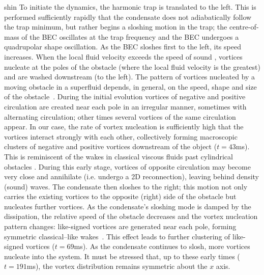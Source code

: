\begin{chapter}{\label{cha:shin}shin}
To initiate the dynamics, the harmonic trap is translated to the left.  This is performed sufficiently rapidly that the condensate does not adiabatically follow the trap minimum, but rather begins a sloshing motion in the trap; the centre-of-mass of the BEC oscillates at the trap frequency and the BEC undergoes a quadrupolar shape oscillation.  As the BEC sloshes first to the left, its speed increases.  When the local fluid velocity exceeds the speed of sound \cite{frisch_92}, vortices nucleate at the poles of the obstacle
(where the local fluid velocity is the greatest) 
and are washed downstream (to the left).  
The pattern of vortices nucleated by a moving obstacle 
in a superfluid depends, in general, on the  speed, shape and size of 
the obstacle~\citep{jackson_mccann_00,sasaki_suzuki_10,stagg_parker_14}. 
During the initial evolution vortices of negative
and positive circulation are created near each pole in an 
irregular manner, sometimes with alternating circulation;  
other times several vortices of the same circulation appear.  
In our case, the rate of vortex nucleation is sufficiently 
high that the vortices interact strongly with each other, 
collectively forming macroscopic clusters of negative and positive 
vortices downstream of the object ($t=43$ms).  This is reminiscent of the wakes in classical viscous fluids past cylindrical obstacles \cite{stagg_parker_14}.  
During this early stage, vortices of opposite 
circulation may become very close and annihilate (i.e. undergo 
a 2D reconnection), leaving behind density (sound) waves. The condensate then sloshes to the right; this 
motion not only carries the existing vortices to the opposite 
(right) side of the obstacle but nucleates further vortices. 
As the condensate's sloshing mode is damped by 
the dissipation, the relative speed of the obstacle decreases
and the vortex nucleation pattern changes: 
like-signed vortices are generated near each pole, 
forming symmetric classical--like wakes~\cite{stagg_parker_14}. 
This effect leads to further clustering of like-signed vortices   
($t=69$ms). As the condensate continues to slosh, more
vortices nucleate into the system. It must be stressed that,
up to these early times ($t=191$ms), the vortex distribution remains symmetric 
about the $x$ axis.   %


\end{chapter}

